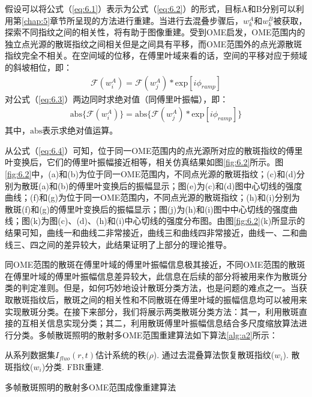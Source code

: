 假设可以将公式（\ref{eq:6.1}）表示为公式（\ref{eq:6.2}）的形式，目标A和B分别可以利用第\ref{chap:5}章节所呈现的方法进行重建。当进行去混叠步骤后，$w_{k}^{A}$和$w_{k}^{B}$被获取，探索不同指纹之间的相关性，将有助于图像重建。受到OME启发，OME范围内的独立点光源的散斑指纹之间相关但是之间具有平移\cite{Freund1988}，而OME范围外的点光源散斑指纹完全不相关。在空间域的位移，在傅里叶域来看的话，空间的平移对应于频域的斜坡相位，即：
\begin{equation}
\begin{aligned}
\mathcal{F}(w_i^{A}) = \mathcal{F}(w_j^{A})*\mbox{exp}[i\phi_{ramp}]
\label{eq:6.3}
\end{aligned}
\end{equation} 对公式（\ref{eq:6.3}）两边同时求绝对值（同傅里叶振幅），即：
\begin{equation}
\begin{aligned}
\mbox{abs} \{ \mathcal{F}(w_i^{A})\} = \mbox{abs} \{  \mathcal{F}(w_j^{A})*\mbox{exp}[i\phi_{ramp}] \}
\label{eq:6.4}
\end{aligned}
\end{equation}其中，$\mbox{abs}$表示求绝对值运算。

从公式（\ref{eq:6.4}）可知，位于同一OME范围内的点光源所对应的散斑指纹的傅里叶变换后，它们的傅里叶振幅接近相等，相关仿真结果如图\ref{fig:6.2}所示。图\ref{fig:6.2}中，(a)和(b)为位于同一OME范围内，不同点光源的散斑指纹；(c)和(d)分别为散斑(a)和(b)的傅里叶变换后的振幅显示；图(e)为(c)和(d)图中心切线的强度曲线；(f)和(g)为位于同一OME范围内，不同点光源的散斑指纹；(h)和(i)分别为散斑(f)和(g)的傅里叶变换后的振幅显示；图(j)为(h)和(i)图中中心切线的强度曲线；图(k)为图(c)、(d)、(h)和(i)中心切线的强度分布图。由图\ref{fig:6.2}(k)所显示的结果可知，曲线一和曲线二非常接近，曲线三和曲线四非常接近，曲线一、二和曲线三、四之间的差异较大，此结果证明了上部分的理论推导。

同OME范围的散斑在傅里叶域的傅里叶振幅信息极其接近，不同OME范围的散斑在傅里叶域的傅里叶振幅信息差异较大，此信息在后续的部分将被用来作为散斑分类的判定准则。但是，如何巧妙地设计散斑分类方法，也是问题的难点之一。当获取散斑指纹后，散斑之间的相关性和不同散斑在傅里叶域的振幅信息均可以被用来实现散斑分类。在接下来部分，我们将展示两类散斑分类方法：其一，利用散斑直接的互相关信息实现分类；其二，利用散斑傅里叶振幅信息结合多尺度缩放算法进行分类。多帧散斑照明的散射多OME范围重建算法如下算法\ref{alg:a2}所示：

\begin{algorithm2e}[htp]
\DontPrintSemicolon
\SetAlgoLined
{}
从系列数据集$I_{fluo}(r,t)$估计系统的秩($\rho$).\;
通过去混叠算法恢复散斑指纹($w_{i}$).\;
散斑指纹($w_{i}$)分类.\;
FBR重建.\;
\caption{多帧散斑照明的散射多OME范围成像重建算法}
\label{alg:a2}
\end{algorithm2e}

